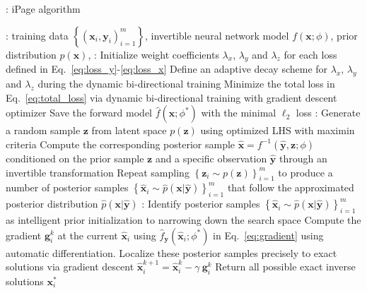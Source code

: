 \documentclass[letterpaper]{article} %
\begin{document}
\begin{algorithm}[h!]\label{algo:1}
\footnotesize
  \caption{\hspace{-0.1cm}: iPage algorithm}
\begin{algorithmic}[1]
: training data $\left\{(\mathbf{x}_i, \mathbf{y}_i)_{i=1}^m \right\}$, invertible neural network model $f(\mathbf{x};\phi)$, prior distribution $p(\mathbf{x})$,
:
\STATE Initialize weight coefficients $\lambda_x$, $\lambda_y$ and $\lambda_z$  for each loss defined in Eq.~\eqref{eq:loss_y}-\eqref{eq:loss_x}
\STATE Define an adaptive decay scheme for $\lambda_x$, $\lambda_y$ and $\lambda_z$ during the dynamic bi-directional training
\STATE Minimize the total loss in Eq.~\eqref{eq:total_loss} via dynamic bi-directional training with gradient descent optimizer
\STATE Save the forward model $\hat{f}(\mathbf{x}; \phi^*)$ with the minimal $\ell_2$ loss
:
\STATE Generate a random sample $\mathbf{z}$ from latent space $p(\mathbf z)$ using optimized LHS with maximin criteria
\STATE Compute the corresponding posterior sample $\hat{\mathbf{x}} = f^{-1}(\hat{\mathbf{y}}, \mathbf{z}; \phi)$ conditioned on the prior sample $\mathbf z$ and a specific observation $\hat{\mathbf{y}}$ through an invertible transformation
\STATE Repeat sampling $\left\{\mathbf{z}_i \sim p(\mathbf{z}) \right\}_{i=1}^m$ to produce a number of posterior samples $\left\{\hat{\mathbf{x}}_i \sim \hat{p}({\mathbf{x}} | \hat{\mathbf{y}}) \right\}_{i=1}^m$ that follow the approximated posterior distribution $\hat{p}(\mathbf{x} | \hat{\mathbf{y}})$
:
\STATE Identify posterior samples $\left\{\hat{\mathbf{x}}_i \sim \hat{p}({\mathbf{x}} | \hat{\mathbf{y}}) \right\}_{i=1}^m$ as intelligent prior initialization to narrowing down the search space
\STATE Compute the gradient $\mathbf{g}_i^{k}$ at the current $\hat{\mathbf{x}}_i$ using $\hat{f}_{\mathbf{y}}(\hat{\mathbf{x}}_i;{\phi}^*)$ in Eq.~\eqref{eq:gradient} using automatic differentiation.
\STATE Localize these posterior samples precisely to exact solutions via gradient descent $\hat{\mathbf{x}}_{i}^{k+1} = \hat{\mathbf{x}}_i^{k} -\gamma ~ \mathbf{g}_i^{k}$
\STATE Return all possible exact inverse solutions $\mathbf{x}_i^{*}$
\end{algorithmic}
\end{algorithm}
\end{document}
